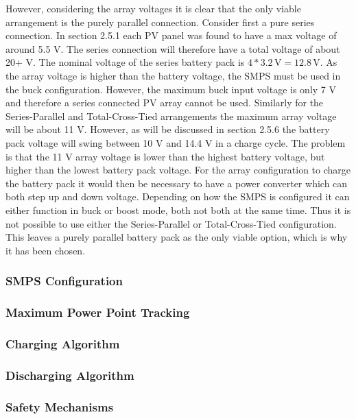 \documentclass[a4paper]{article}
\newcommand{\unit}[1]{\ensuremath{\, \mathrm{#1}}}
\begin{document}
However, considering the array voltages it is clear that the only viable arrangement 
is the purely parallel connection. Consider first a pure series connection. In 
section 2.5.1 each PV panel was found to have a max voltage of around 5.5 V. 
The series connection will therefore have a total voltage of about 20+ V. 
The nominal voltage of the series battery pack is \(4 * 3.2 \unit{V} = 12.8 \unit{V} \). As the array voltage is higher than the battery voltage, the SMPS must 
be used in the buck configuration. However, the maximum buck input voltage 
is only 7 V\cite{PMOS} and therefore a series connected PV array 
cannot be used. Similarly for the Series-Parallel and Total-Cross-Tied 
arrangements the maximum array voltage will be about 11 V. However, 
as will be discussed in section 2.5.6 the battery pack voltage will 
swing between 10 V and 14.4 V in a charge cycle. The problem is that 
the 11 V array voltage is lower than the highest battery voltage, but
 higher than the lowest battery pack voltage. For the array configuration
to charge the battery pack it would then be necessary to have a power
converter which can both step up and down voltage. Depending on how the 
SMPS is configured it can either function in buck or boost mode, both not 
both at the same time. Thus it is not possible to use either the Series-Parallel
or Total-Cross-Tied configuration. This leaves a purely parallel battery 
pack as the only viable option, which is why it has been chosen. 


\subsubsection{SMPS Configuration}

\subsubsection{Maximum Power Point Tracking}

\subsubsection{Charging Algorithm}

\subsubsection{Discharging Algorithm}

\subsubsection{Safety Mechanisms}
\end{document}
